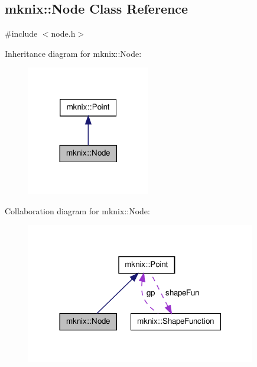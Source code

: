 \hypertarget{classmknix_1_1_node}{\subsection{mknix\-:\-:Node Class Reference}
\label{classmknix_1_1_node}
}


{\ttfamily \#include $<$node.\-h$>$}



Inheritance diagram for mknix\-:\-:Node\-:\nopagebreak
\begin{figure}[H]
\begin{center}
\leavevmode
\includegraphics[width=152pt]{d0/de4/classmknix_1_1_node__inherit__graph}
\end{center}
\end{figure}


Collaboration diagram for mknix\-:\-:Node\-:\nopagebreak
\begin{figure}[H]
\begin{center}
\leavevmode
\includegraphics[width=284pt]{de/d85/classmknix_1_1_node__coll__graph}
\end{center}
\end{figure}
